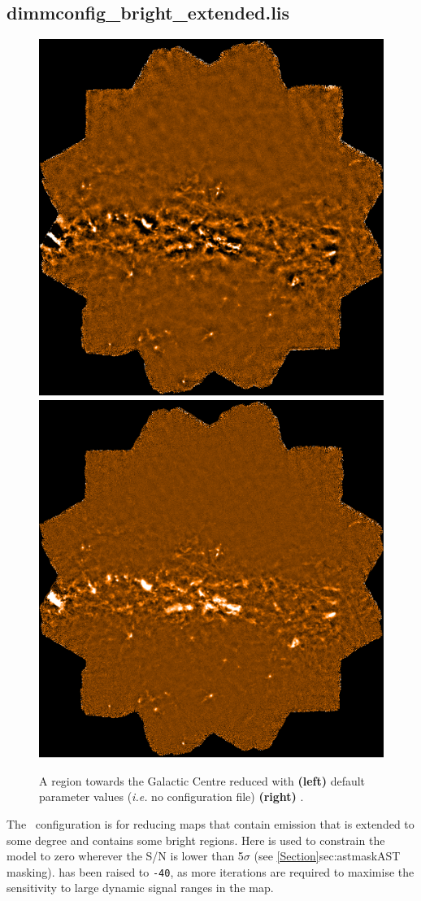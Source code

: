 \subsection{dimmconfig\_bright\_extended.lis}

\begin{figure}[t!]
\includegraphics[width=0.47\linewidth]{sc21_gal_def}
\hspace{3mm}
\includegraphics[width=0.47\linewidth]{sc21_gal_brex}
\caption[Example map reduced with
  ]
   {A region towards the Galactic Centre reduced with \textbf{(left)}
   default parameter values (\emph{i.e.} no configuration file) \textbf{(right)}
   .\label{fig:becompare}}
\end{figure}

The \brightextended\ configuration is for reducing maps that contain
emission that is extended to some degree and contains some bright
regions. Here  is used to constrain
the  model to zero wherever the S/N is lower than 5$\sigma$
(see \cref{Section}{sec:astmask}{AST masking}). 
has been raised to \texttt{-40}, as more iterations are required to
maximise the sensitivity to large dynamic signal ranges in the map.

